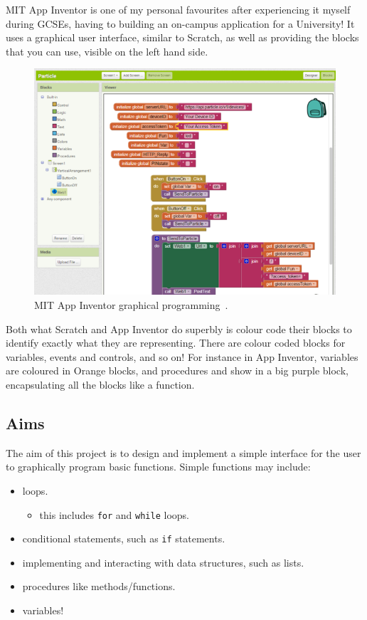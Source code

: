 \documentclass[a4paper, 12pt]{article}
\begin{document}
    \clearpage
    MIT App Inventor is one of my personal favourites after experiencing it myself during GCSEs, 
    having to building an on-campus application for a University! It uses a graphical user 
    interface, similar to Scratch, as well as providing the blocks that you can use, visible on 
    the left hand side.

    \begin{figure}[h]
        \centering
        \includegraphics[width=150mm]{app_inventor}
        \caption{MIT App Inventor graphical programming~\cite{adafruit}.}
    \end{figure}

    Both what Scratch and App Inventor do superbly is colour code their blocks to identify 
    exactly what they are representing. There are colour coded blocks for variables, events 
    and controls, and so on! For instance in App Inventor, variables are coloured in Orange 
    blocks, and procedures and show in a big purple block, encapsulating all the blocks like 
    a function.

        \subsection{Aims}
            The aim of this project is to design and implement a simple interface for the
            user to graphically program basic functions. Simple functions may include:

            \begin{itemize}
                \item loops.
                \begin{itemize}
                    \item this includes \texttt{for} and \texttt{while} loops.
                \end{itemize}
                \item conditional statements, such as \texttt{if} statements.
                \item implementing and interacting with data structures, such as lists.
                \item procedures like methods/functions.
                \item variables!
            \end{itemize}
            
\end{document}
